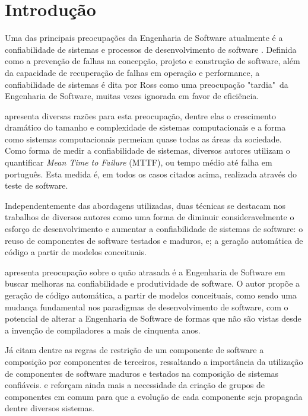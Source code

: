 \chapter{Introdução}

Uma das principais preocupações da Engenharia de Software atualmente é a confiabilidade de sistemas e processos de desenvolvimento de software \cite{ROSS:1975} \cite{SOMMERVILLE:2011}. Definida como a prevenção de falhas na concepção, projeto e construção de software, além da capacidade de recuperação de falhas em operação e performance, a confiabilidade de sistemas é dita por Ross como uma preocupação "tardia"\ da Engenharia de Software, muitas vezes ignorada em favor de eficiência.

 apresenta diversas razões para esta preocupação, dentre elas o crescimento dramático do tamanho e complexidade de sistemas computacionais e a forma como sistemas computacionais permeiam quase todas as áreas da sociedade. Como forma de medir a confiabilidade de sistemas, diversos autores \cite{LYU:1996}\cite{MUSA:1979}\cite{REUSSNER:2003} utilizam o quantificar \textit{Mean Time to Failure} (MTTF), ou tempo médio até falha em português. Esta medida é, em todos os casos citados acima, realizada através do teste de software.

Independentemente das abordagens utilizadas, duas técnicas se destacam nos trabalhos de diversos autores \cite{JIFENG:2005}\cite{SELIC:2003}\cite{CZARNECKI:2000}\cite{STAHL:2006}\cite{CRNKOVIC:2002a}\cite{CLEMENTS:2001} como uma forma de diminuir consideravelmente o esforço de desenvolvimento e aumentar a confiabilidade de sistemas de software: o reuso de componentes de software testados e maduros, e; a geração automática de código a partir de modelos conceituais.

 apresenta preocupação sobre o quão atrasada é a Engenharia de Software em buscar melhoras na confiabilidade e produtividade de software. O autor propõe a geração de código automática, a partir de modelos conceituais, como sendo uma mudança fundamental nos paradigmas de desenvolvimento de software, com o potencial de alterar a Engenharia de Software de formas que não são vistas desde a invenção de compiladores a mais de cinquenta anos.

Já  citam dentre as regras de restrição de um componente de software a composição por componentes de terceiros, ressaltando a importância da utilização de componentes de software maduros e testados na composição de sistemas confiáveis.  e  reforçam ainda mais a necessidade da criação de grupos de componentes em comum para que a evolução de cada componente seja propagada dentre diversos sistemas.

